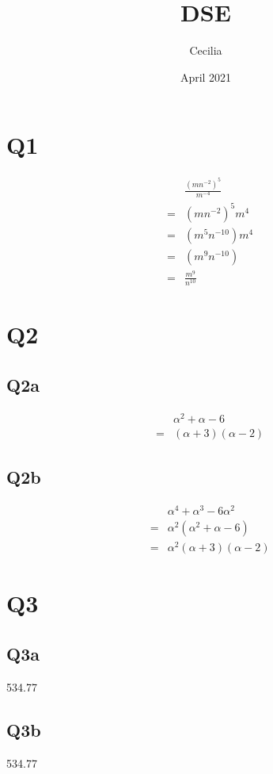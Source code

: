 \documentclass{article}
\title{DSE}
\author{Cecilia}
\date{April 2021}
\begin{document}
\maketitle


\section{Q1}
\begin{eqnarray*}
  & & \frac{(mn^{-2})^5}{m^{-4}} \\
  &=& (mn^{-2})^5m^4 \\
  &=& (m^5n^{-10})m^4 \\
  &=& (m^9n^{-10}) \\
  &=& \frac{m^9}{n^{10}}
\end{eqnarray*}

\section{Q2}
\subsection{Q2a}
\begin{eqnarray*}
  & & \alpha^2 + \alpha - 6 \\
  &=& (\alpha + 3)(\alpha - 2)
\end{eqnarray*}

\subsection{Q2b}
\begin{eqnarray*}
  & & \alpha^4 + \alpha^3 - 6\alpha^2 \\
  &=& \alpha^2(\alpha^2 + \alpha - 6) \\
  &=& \alpha^2 (\alpha + 3)(\alpha - 2)
\end{eqnarray*}

\section{Q3}
\subsection{Q3a}
534.77
\subsection{Q3b}
534.77
\end{document}
